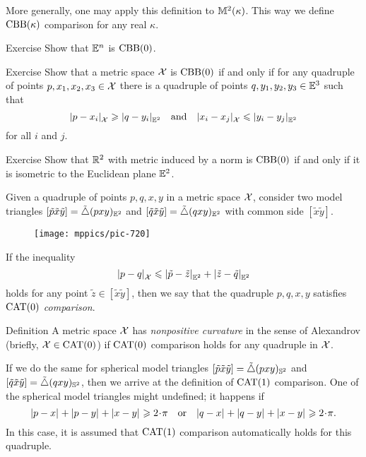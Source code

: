 More generally, one may apply this definition to $\mathbb{M}^2(\kappa)$.
This way we define $\mathrm{CBB}(\kappa)$ comparison for any real $\kappa$.

\begin{thm}{Exercise}
Show that $\mathbb{E}^n$ is $\mathrm{CBB}(0)$.
\end{thm}

\begin{thm}{Exercise}\label{ex:(3+1)-expanding}
Show that a metric space $\mathcal{X}$ is $\mathrm{CBB}(0)$
if and only if for any quadruple of points $p,x_1,x_2,x_3\in \mathcal{X}$ 
there is a quadruple of points $q,y_1,y_2,y_3\in\mathbb{E}^3$
such that 
\[\dist{p}{x_i}{\spc{X}}\ge\dist{q}{y_i}{\EE^2} 
\quad \text{and}\quad
\dist{x_i}{x_j}{\spc{X}}\le\dist{y_i}{y_j}{\EE^2}\] 
for all $i$ and $j$.
\end{thm}

\begin{thm}{Exercise}\label{ex:normCBB}
Show that $\mathbb{R}^2$ with metric induced by a norm is $\mathrm{CBB}(0)$ if and only if it is isometric to the Euclidean plane $\mathbb{E}^2$.
\end{thm}

Given a quadruple of points $p,q,x,y$ in a metric space $\mathcal{X}$,
consider two model triangles 
$[\tilde p\tilde x\tilde y]=\tilde\triangle{}(pxy)_{\mathbb{E}^2}$ 
and 
$\trig{\tilde q}{\tilde x}{\tilde y}\z=\modtrig{}(qxy)_{\EE^2}$ with common side $[\tilde x\tilde y]$.

\begin{wrapfigure}{r}{25mm}
\vskip-4mm
\centering
\texttt{[image: mppics/pic-720]}
\end{wrapfigure}

If the inequality
\[\dist{p}{q}{\spc{X}}\le \dist{\tilde p}{\tilde z}{\EE^2}+\dist{\tilde z}{\tilde q}{\EE^2}\]
holds for any point $\tilde z\in [\tilde x\tilde y]$, then we say that 
the quadruple $p,q,x,y$ satisfies \index{$\CAT$}\emph{$\mathrm{CAT}(0)$ comparison}.
\label{page:CAT-comparison}

\begin{thm}{Definition}\label{def:CBB}
A metric space $\mathcal{X}$ has \index{$\CAT$}\emph{nonpositive curvature} in the sense of Alexandrov (briefly, $\mathcal{X}\in\mathrm{CAT}(0)$) if $\mathrm{CAT}(0)$ comparison holds for any quadruple in $\mathcal{X}$.
\end{thm}

If we do the same for spherical model triangles  
$[\tilde p\tilde x\tilde y]=\tilde\triangle{}(pxy)_{\mathbb{S}^2}$ 
and 
$[\tilde q\tilde x\tilde y]=\tilde\triangle{}(qxy)_{\mathbb{S}^2}$,
then we arrive at the definition of $\mathrm{CAT}(1)$ comparison.
One of the spherical model triangles might undefined;
it happens if 
\[\dist{p}{x}{}+\dist{p}{y}{}+\dist{x}{y}{}\ge 2\cdot\pi
\quad
\text{or}
\quad
\dist{q}{x}{}+\dist{q}{y}{}+\dist{x}{y}{}\ge 2\cdot\pi.\]
In this case, it is assumed that $\mathrm{CAT}(1)$ comparison automatically holds for this quadruple.

